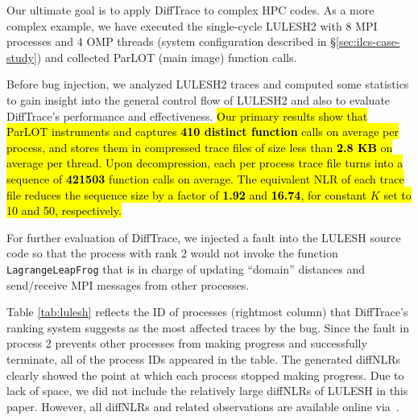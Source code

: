 

Our ultimate goal is to apply DiffTrace to complex HPC codes.
%
As a more complex example, we have executed the single-cycle LULESH2\cite{LULESH2:changes} with 8 MPI processes
and 4 OMP threads (system configuration described in \S\ref{sec:ilcs-case-study})
and collected ParLOT (main image) function calls.


Before bug injection, we analyzed LULESH2 traces and computed some statistics to gain insight into the
general control flow of LULESH2 and also to evaluate DiffTrace's
performance and effectiveness.
%
\hl{Our primary results show that ParLOT instruments and captures \textbf{410 distinct function} calls on
average per process, and stores them in compressed trace files of size less than \textbf{2.8 KB}
on average per thread.
%
Upon decompression, each per process trace file
turns into a sequence of \textbf{421503} function calls on average. The equivalent NLR of each trace file reduces the sequence size by a factor of \textbf{1.92} and \textbf{16.74}, for constant $K$ set to 10 and 50, respectively.}
%
%
%
%
%


For further evaluation of DiffTrace, we injected a fault into the LULESH source code so that the process with rank 2
would not invoke the function \texttt{LagrangeLeapFrog} that is in charge of updating ``domain'' distances and send/receive
MPI messages from other processes.
%

%
Table \ref{tab:lulesh} reflects the ID of processes (rightmost column)
that DiffTrace's ranking system suggests as the most affected traces by the bug.
%
Since the fault in process 2 prevents other processes from making progress and successfully terminate,
all of the process IDs appeared in the table.
The generated diffNLRs clearly showed the point at which each process stopped making progress.
%
Due to lack of space, we did not include the relatively large diffNLRs of LULESH in this paper.
However, all diffNLRs and related observations are available online via~\cite{diffTraceMaterials}.


